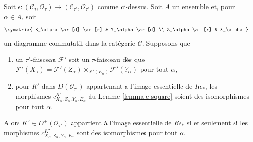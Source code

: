 \begin{lemma}
\label{lemma-descent-squares}
Soit $\epsilon : (\mathcal{C}_\tau, \mathcal{O}_\tau) \to
(\mathcal{C}_{\tau'}, \mathcal{O}_{\tau'})$ comme ci-dessus. Soit $A$ un
ensemble et, pour $\alpha \in A$, soit
$$
\xymatrix{
E_\alpha \ar[d] \ar[r] & Y_\alpha \ar[d] \\
Z_\alpha \ar[r] & X_\alpha
}
$$
un diagramme commutatif dans la catégorie $\mathcal{C}$. Supposons que
\begin{enumerate}
\item un $\tau'$-faisceau $\mathcal{F}'$ soit un $\tau$-faisceau dès que
$\mathcal{F}'(X_\alpha) =
\mathcal{F}'(Z_\alpha) \times_{\mathcal{F}'(E_\alpha)} 
\mathcal{F}'(Y_\alpha)$ pour tout $\alpha$,
\item pour $K'$ dans $D(\mathcal{O}_{\tau'})$ appartenant à l'image
essentielle de $R\epsilon_*$, les morphismes
$c^{K'}_{X_\alpha, Z_\alpha, Y_\alpha, E_\alpha}$ du Lemme
\ref{lemma-c-square} soient des isomorphismes pour tout $\alpha$.
\end{enumerate}
Alors $K' \in D^+(\mathcal{O}_{\tau'})$ appartient à l'image essentielle de
$R\epsilon_*$ si et seulement si les morphismes
$c^{K'}_{X_\alpha, Z_\alpha, Y_\alpha, E_\alpha}$ sont des isomorphismes
pour tout $\alpha$.
\end{lemma}

